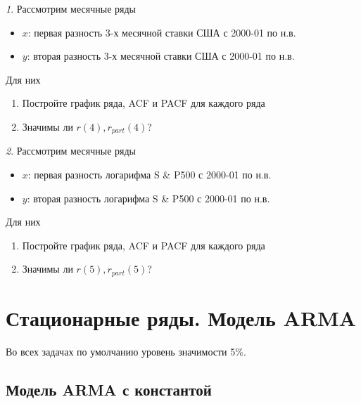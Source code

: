\documentclass[12pt]{article}
\theoremstyle{remark}
\newtheorem{exercise}{}[subsection]
\begin{document}
\begin{exercise}
Рассмотрим месячные ряды
\begin{itemize}
	\item \(x\): первая разность 3-х месячной ставки США с 2000-01 по
	н.в.
	\item \(y\): вторая разность 3-х месячной ставки США с 2000-01 по
	н.в.
\end{itemize}
Для них
\begin{enumerate}
	\item Постройте график ряда, ACF и PACF для каждого ряда
	\item Значимы ли \(r(4),r_{part}(4)\)?
\end{enumerate}
\end{exercise}

\begin{exercise}
Рассмотрим месячные ряды
\begin{itemize}
	\item \(x\): первая разность логарифма S \& P500 с 2000-01 по
	н.в.
	\item \(y\): вторая разность логарифма S \& P500 с 2000-01 по
	н.в.
\end{itemize}
Для них
\begin{enumerate}
	\item Постройте график ряда, ACF и PACF для каждого ряда
	\item Значимы ли \(r(5),r_{part}(5)\)?
\end{enumerate}
\end{exercise}

\section{Стационарные ряды. Модель ARMA}

Во всех задачах по умолчанию уровень значимости 5\%.


\subsection{Модель ARMA с константой}
\end{document}

